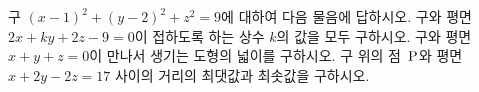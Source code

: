 구 $(x-1)^2+(y-2)^2+z^2=9$에 대하여 다음 물음에 답하시오.
 구와 평면 $2x+ky+2z-9=0$이 접하도록 하는 상수 $k$의 값을 모두 구하시오.
 구와 평면 $x+y+z=0$이 만나서 생기는 도형의 넓이를 구하시오.
 구 위의 점~$\mathrm{P}$와 평면 $x+2y-2z=17$ 사이의 거리의 최댓값과 최솟값을 구하시오.
